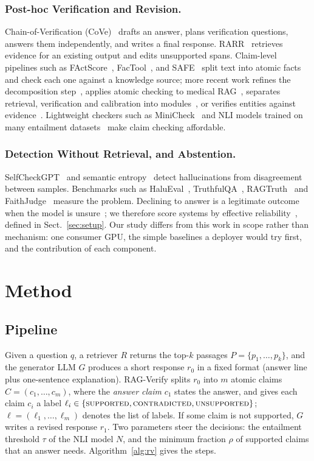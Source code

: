 \documentclass{svproc}
\begin{document}
\subsubsection{Post-hoc Verification and Revision.} Chain-of-Verification (CoVe)~\cite{dhuliawala2023cove} drafts an answer, plans verification questions, answers them independently, and writes a final response. RARR~\cite{gao2022rarr} retrieves evidence for an existing output and edits unsupported spans. Claim-level pipelines such as FActScore~\cite{min2023factscore}, FacTool~\cite{chern2023factool}, and SAFE~\cite{wei2024safe} split text into atomic facts and check each one against a knowledge source; more recent work refines the decomposition step~\cite{afev2025}, applies atomic checking to medical RAG~\cite{vladika2025medical}, separates retrieval, verification and calibration into modules~\cite{r2vc2026}, or verifies entities against evidence~\cite{jia2026entity}. Lightweight checkers such as MiniCheck~\cite{tang2024minicheck} and NLI models trained on many entailment datasets~\cite{laurer2023nli,he2021debertav3} make claim checking affordable.

\subsubsection{Detection Without Retrieval, and Abstention.} SelfCheckGPT~\cite{manakul2023selfcheckgpt} and semantic entropy~\cite{farquhar2024semantic} detect hallucinations from disagreement between samples. Benchmarks such as HaluEval~\cite{li2023halueval}, TruthfulQA~\cite{lin2021truthfulqa}, RAGTruth~\cite{niu2023ragtruth} and FaithJudge~\cite{tamber2025faithjudge} measure the problem. Declining to answer is a legitimate outcome when the model is unsure~\cite{wen2024abstention}; we therefore score systems by effective reliability~\cite{whitehead2022reliable}, defined in Sect.~\ref{sec:setup}. Our study differs from this work in scope rather than mechanism: one consumer GPU, the simple baselines a deployer would try first, and the contribution of each component.

\section{Method}
\subsection{Pipeline}
Given a question $q$, a retriever $R$ returns the top-$k$ passages $P=\{p_1,\dots,p_k\}$, and the generator LLM $G$ produces a short response $r_0$ in a fixed format (answer line plus one-sentence explanation). RAG-Verify splits $r_0$ into $m$ atomic claims $C=(c_1,\dots,c_m)$, where the \emph{answer claim} $c_1$ states the answer, and gives each claim $c_i$ a label $\ell_i\in\{\textsc{supported},\textsc{contradicted},\textsc{unsupported}\}$; $\ell=(\ell_1,\dots,\ell_m)$ denotes the list of labels. If some claim is not supported, $G$ writes a revised response $r_1$. Two parameters steer the decisions: the entailment threshold $\tau$ of the NLI model $N$, and the minimum fraction $\rho$ of supported claims that an answer needs. Algorithm~\ref{alg:rv} gives the steps.
\end{document}
